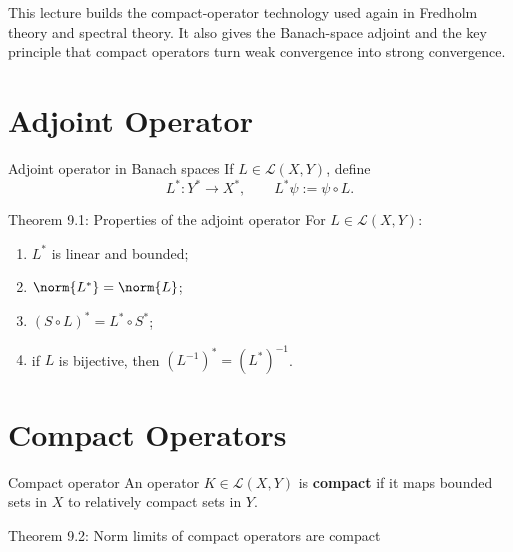 \documentclass[11pt]{article}
\begin{document}

\vspace{0.8em}

\begin{focusbox}
This lecture builds the compact-operator technology used again in Fredholm theory and spectral theory. It also gives the Banach-space adjoint and the key principle that compact operators turn weak convergence into strong convergence.
\end{focusbox}

\tableofcontents

\section{Adjoint Operator}

\begin{defbox}{Adjoint operator in Banach spaces}
If $L\in\mathcal L(X,Y)$, define
\[
L^*:Y^*\to X^*,
\qquad
L^*\psi:=\psi\circ L.
\]
\end{defbox}

\begin{thmbox}{Theorem 9.1: Properties of the adjoint operator}
For $L\in\mathcal L(X,Y)$:
\begin{enumerate}
\item $L^*$ is linear and bounded;
\item $\norm{L^*}=\norm{L}$;
\item $(S\circ L)^*=L^*\circ S^*$;
\item if $L$ is bijective, then $(L^{-1})^*=(L^*)^{-1}$.
\end{enumerate}
\end{thmbox}

\section{Compact Operators}

\begin{defbox}{Compact operator}
An operator $K\in\mathcal L(X,Y)$ is \textbf{compact} if it maps bounded sets in $X$ to relatively compact sets in $Y$.
\end{defbox}

\begin{thmbox}{Theorem 9.2: Norm limits of compact operators are compact}
\thmCompactLimit
\end{thmbox}
\end{document}
